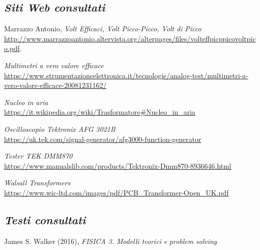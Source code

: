 \documentclass[a4paper]{article}
\begin{document}
	
\newpage
	\begin{thebibliography}{10}
		
		\subsection*{\textit{Siti Web consultati}}
		
		Marrazzo Antonio, 
		\emph{Volt Efficaci, Volt Picco-Picco, Volt di Picco} \\
		\url{http://www.marrazzoantonio.altervista.org/alterpages/files/volteffpicppicovoltpico.pdf}.
		
		\emph{Multimetri a vero valore efficace} \\
		\url{https://www.strumentazioneelettronica.it/tecnologie/analog-test/multimetri-a-vero-valore-efficace-20081231162/}
		
		\emph{Nucleo in aria} \\
		\url{https://it.wikipedia.org/wiki/Trasformatore#Nucleo_in_aria}
		
		\emph{Oscilloscopio Tektronix AFG 3021B} \\
		\url{https://uk.tek.com/signal-generator/afg3000-function-generator}
		
		\emph{Tester TEK DMM870} \\
		\url{https://www.manualslib.com/products/Tektronix-Dmm870-8936646.html}
		
		\emph{Walsall Transformers} \\
		\url{https://www.wic-ltd.com/images/pdf/PCB_Transformer-Open_UK.pdf}
		
		
		\subsection*{\textit{Testi consultati}}
		
		James S. Walker (2016), \emph{FISICA 3. Modelli teorici e problem solving} \\
		
	\end{thebibliography}
\end{document}
